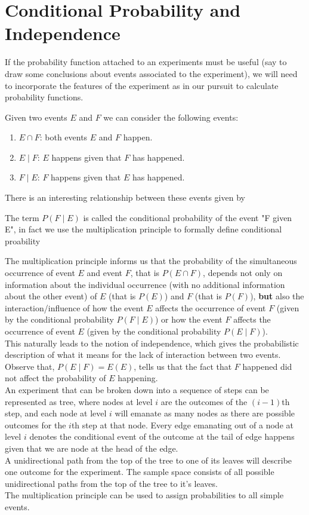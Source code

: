 \section{Conditional Probability and Independence}
If the probability function attached to an experiments must be useful (say to draw some conclusions about events associated to the experiment), we will need to incorporate the features of the experiment as in our pursuit to calculate probability functions. 



Given two events $E$ and $F$ we can consider the following events:
\begin{enumerate}
    \item $E\cap F$: both events $E$ and $F$ happen. 
    \item $E\mid F$: $E$ happens given that $F$ has happened.
    \item $F\mid E$: $F$ happens given that $E$ has happened.
\end{enumerate}
There is an interesting relationship between these events given by 

The term $P(F\mid E)$ is called the conditional probability of the event "F given E", in fact we use the multiplication principle to formally define conditional proability


The multiplication principle informs us that the probability of the simultaneous occurrence of event $E$ and event $F$, that is $P(E\cap F)$, depends not only on information about the individual occurrence (with no additional information about the other event) of $E$ (that is $P(E)$) and $F$ (that is $P(F)$), \textbf{but} also the interaction/influence of how the event $E$ affects the occurrence of event $F$ (given by the conditional probability $P(F \mid E)$) or how the event $F$ affects the occurrence of event $E$ (given by the conditional probability $P(E \mid F)$).
\\

This naturally leads to the notion of independence, which gives the probabilistic description of what it means for the lack of interaction between two events. 
\\



Observe that, $P(E \mid F) = E(E)$, tells us that the fact that $F$ happened did not affect the probability of $E$ happening. 
\\


An experiment that can be broken down into a sequence of steps can be represented as tree, where nodes at level $i$ are the outcomes of the $(i-1)$th step, and each node at level $i$ will emanate as many nodes as there are possible outcomes for the $i$th step at that node. Every edge emanating out of a node at level $i$ denotes the conditional event of the outcome at the tail of edge happens given that we are node at the head of the edge. 
\\
A unidirectional path from the top of the tree to one of its leaves will describe one outcome for the experiment. The sample space consists of all possible unidirectional paths from the top of the tree to it's leaves. 
\\
The multiplication principle can be used to assign probabilities to all simple events. 


